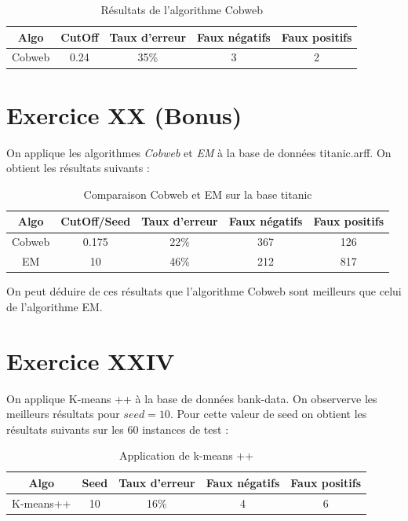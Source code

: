 \documentclass[a4paper, 11pt]{report}
\begin{document}
        \begin{table}[h!]
        \centering
        \begin{tabular}{| c | c | c | c | c |}
        \hline
         Algo & CutOff & Taux d'erreur & Faux négatifs & Faux positifs  \\
         \hline
         Cobweb & 0.24 & 35\% & 3 & 2 \\
         \hline
         
         
        \end{tabular}
        \caption{Résultats de l'algorithme Cobweb}
        \label{tab:exo18}
        \end{table}
        
        \section{Exercice XX (Bonus)}
        On applique les algorithmes \emph{Cobweb} et \emph{EM} à la base de données titanic.arff. On obtient les résultats suivants :
        \begin{table}[h!]
        \centering
        \begin{tabular}{| c | c | c | c | c |}
        \hline
         Algo & CutOff/Seed & Taux d'erreur & Faux négatifs & Faux positifs  \\
         \hline
         Cobweb & 0.175 & 22\% & 367 & 126 \\
         \hline
         EM & 10 & 46\% & 212 & 817 \\
         \hline
         
        \end{tabular}
        \caption{Comparaison Cobweb et EM sur la base titanic}
        \label{tab:exo20}
        \end{table}
        
        On peut déduire de ces résultats que l'algorithme Cobweb sont meilleurs que celui de l'algorithme EM.
        
        \section{Exercice XXIV}
        On applique K-means ++ à la base de données bank-data. On observerve les meilleurs résultats pour $seed = 10$. Pour cette valeur de seed on obtient les résultats suivants sur les 60 instances de test :
        
        \begin{table}[h!]
        \centering
        \begin{tabular}{| c | c | c | c | c |}
        \hline
         Algo & Seed & Taux d'erreur & Faux négatifs & Faux positifs  \\
         \hline
         K-means++ & 10 & 16\% & 4 & 6 \\
         \hline
        \end{tabular}
        \caption{Application de k-means ++}
        \label{tab:exo24}
        \end{table}
        
\end{document}
